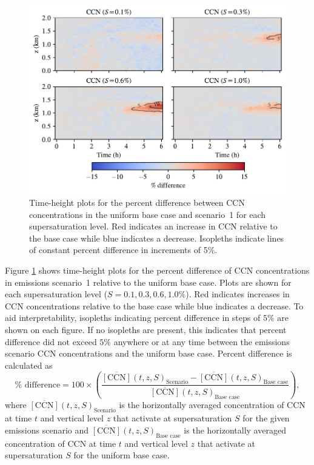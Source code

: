 \begin{figure}[!t]
  \centering
    \includegraphics[width=\textwidth]{figures/chapter5/height-time-ccn-pdiff-fx1fy0.pdf}
    \caption{Time-height plots for the percent difference between CCN concentrations in the uniform base case and scenario~1 for each supersaturation level. Red indicates an increase in CCN relative to the base case while blue indicates a decrease. Isopleths indicate lines of constant percent difference in increments of 5\%.}
    \label{fig:ht-ccn-pdiff-s1}
\end{figure}

Figure \ref{fig:ht-ccn-pdiff-s1} shows time-height plots for the percent difference of CCN concentrations in emissions scenario~1 relative to the uniform base case. Plots are shown for each supersaturation level ($S=0.1, 0.3, 0.6, 1.0\%$). Red indicates increases in CCN concentrations relative to the base case while blue indicates a decrease. To aid interpretability, isopleths indicating percent difference in steps of $5\%$ are shown on each figure. If no isopleths are present, this indicates that percent difference did not exceed $5\%$ anywhere or at any time between the emissions scenario CCN concentrations and the uniform base case. Percent difference is calculated as 
\begin{equation}
    \% \text{ difference} = 100\times\left(\frac{\overline{[\text{CCN}]}(t, z, S)_{\text{Scenario}} - \overline{[\text{CCN}]}(t, z, S)_{\text{Base case}}}{\overline{[\text{CCN}]}(t, z, S)_{\text{Base case}}}\right),
\end{equation}
where $\overline{[\text{CCN}]}(t, z,S)_{\text{Scenario}}$ is the horizontally averaged concentration of CCN at time $t$ and vertical level $z$ that activate at supersaturation $S$ for the given emissions scenario and $\overline{[\text{CCN}]}(t, z, S)_{\text{Base case}}$ is the horizontally averaged concentration of CCN at time $t$ and vertical level $z$ that activate at supersaturation $S$ for the uniform base case.

